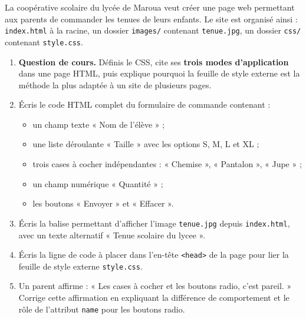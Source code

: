 \documentclass[11pt]{article}
\begin{document}
\begin{exercice}
La coopérative scolaire du lycée de Maroua veut créer une page web permettant aux parents de commander les tenues de leurs enfants. Le site est organisé ainsi : \texttt{index.html} à la racine, un dossier \texttt{images/} contenant \texttt{tenue.jpg}, un dossier \texttt{css/} contenant \texttt{style.css}.
\begin{enumerate}
  \item \textbf{Question de cours.} Définis le CSS, cite ses \textbf{trois modes d'application} dans une page HTML, puis explique pourquoi la feuille de style externe est la méthode la plus adaptée à un site de plusieurs pages.
  \item Écris le code HTML complet du formulaire de commande contenant :
  \begin{itemize}
    \item un champ texte « Nom de l'élève » ;
    \item une liste déroulante « Taille » avec les options S, M, L et XL ;
    \item trois cases à cocher indépendantes : « Chemise », « Pantalon », « Jupe » ;
    \item un champ numérique « Quantité » ;
    \item les boutons « Envoyer » et « Effacer ».
  \end{itemize}
  \item Écris la balise permettant d'afficher l'image \texttt{tenue.jpg} depuis \texttt{index.html}, avec un texte alternatif « Tenue scolaire du lycee ».
  \item Écris la ligne de code à placer dans l'en-tête \texttt{<head>} de la page pour lier la feuille de style externe \texttt{style.css}.
  \item Un parent affirme : « Les cases à cocher et les boutons radio, c'est pareil. » Corrige cette affirmation en expliquant la différence de comportement et le rôle de l'attribut \texttt{name} pour les boutons radio.
\end{enumerate}
\end{exercice}
\end{document}
